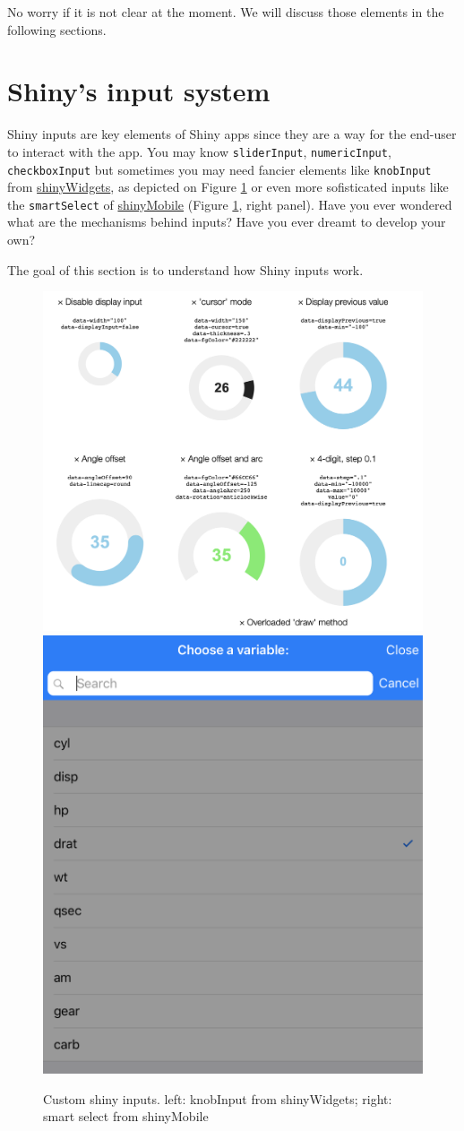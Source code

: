 \documentclass[]{book}
\begin{document}
No worry if it is not clear at the moment. We will discuss those elements in the following sections.

\hypertarget{shinys-input-system}{%
\section{Shiny's input system}\label{shinys-input-system}}

Shiny inputs are key elements of Shiny apps since they are a way for the end-user to interact with the app. You may know \texttt{sliderInput}, \texttt{numericInput}, \texttt{checkboxInput} but sometimes you may need fancier elements like \texttt{knobInput} from \href{https://github.com/dreamRs/shinyWidgets/blob/master/R/input-knob.R}{shinyWidgets}, as depicted on Figure \ref{fig:fancy-inputs} or even more sofisticated inputs like the \texttt{smartSelect} of \href{https://github.com/RinteRface/shinyMobile/blob/master/R/f7-inputs.R}{shinyMobile} (Figure \ref{fig:fancy-inputs}, right panel). Have you ever wondered what are the mechanisms behind inputs? Have you ever dreamt to develop your own?

The goal of this section is to understand how Shiny inputs work.

\begin{figure}
\includegraphics[width=0.5\linewidth]{images/survival-kit/jquery-knobs} \includegraphics[width=0.5\linewidth]{images/survival-kit/smart-select} \caption{Custom shiny inputs. left: knobInput from shinyWidgets; right: smart select from shinyMobile}\label{fig:fancy-inputs}
\end{figure}
\end{document}
